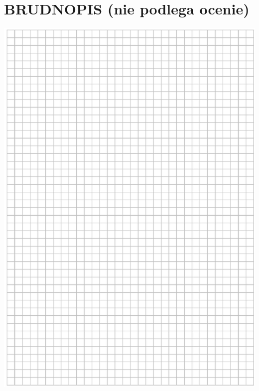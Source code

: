 \documentclass[10pt]{article}
\begin{document}
\section*{BRUDNOPIS (nie podlega ocenie)}
\includegraphics[max width=\textwidth, center]{2024_11_21_46d945490f1b2eff1c8eg-24}\\
\end{document}
